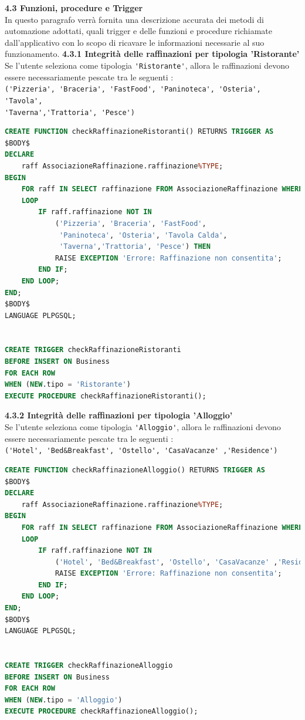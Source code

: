 \documentclass[a4paper,12pt]{article}
\begin{document}
\newpage\null{}\setcounter{page}{18}
\vspace{-2cm}
{\flushleft \bf 4.3 Funzioni, procedure e Trigger}
\\In questo paragrafo verrà fornita una descrizione accurata dei metodi di automazione adottati, quali trigger e delle funzioni e procedure richiamate dall'applicativo con lo scopo di ricavare le informazioni necessarie al suo funzionamento.
\vspace*{+1cm}
\newline
{\bf 4.3.1  Integrità delle raffinazioni per tipologia 'Ristorante'}\\
\normalsize{Se l'utente seleziona come tipologia \verb|'Ristorante'|, allora le raffinazioni
devono essere necessariamente pescate tra le seguenti : \\
\verb|('Pizzeria', 'Braceria', 'FastFood', 'Paninoteca', 'Osteria', 'Tavola',|\\
\verb|'Taverna','Trattoria', 'Pesce')|}
\begin{lstlisting}[language=SQL]
CREATE FUNCTION checkRaffinazioneRistoranti() RETURNS TRIGGER AS
$BODY$
DECLARE
	raff AssociazioneRaffinazione.raffinazione%TYPE;
BEGIN
	FOR raff IN SELECT raffinazione FROM AssociazioneRaffinazione WHERE codBusiness = NEW.codBusiness
	LOOP
		IF raff.raffinazione NOT IN 
			('Pizzeria', 'Braceria', 'FastFood',
			 'Paninoteca', 'Osteria', 'Tavola Calda',
			 'Taverna','Trattoria', 'Pesce') THEN
			RAISE EXCEPTION 'Errore: Raffinazione non consentita';
		END IF;
	END LOOP;
END;
$BODY$
LANGUAGE PLPGSQL;


CREATE TRIGGER checkRaffinazioneRistoranti
BEFORE INSERT ON Business
FOR EACH ROW
WHEN (NEW.tipo = 'Ristorante')
EXECUTE PROCEDURE checkRaffinazioneRistoranti();
\end{lstlisting}
\vspace*{+1cm}

{\flushleft \bf 4.3.2  Integrità delle raffinazioni per tipologia 'Alloggio'}\\
\normalsize{Se l'utente seleziona come tipologia \verb|'Alloggio'|, allora le raffinazioni
devono essere necessariamente pescate tra le seguenti : \\
\verb|('Hotel', 'Bed&Breakfast', 'Ostello', 'CasaVacanze' ,'Residence')|}
\begin{lstlisting}[language=SQL]
CREATE FUNCTION checkRaffinazioneAlloggio() RETURNS TRIGGER AS
$BODY$
DECLARE
	raff AssociazioneRaffinazione.raffinazione%TYPE;
BEGIN
	FOR raff IN SELECT raffinazione FROM AssociazioneRaffinazione WHERE codBusiness = NEW.codBusiness
	LOOP
		IF raff.raffinazione NOT IN 
			('Hotel', 'Bed&Breakfast', 'Ostello', 'CasaVacanze' ,'Residence') THEN
			RAISE EXCEPTION 'Errore: Raffinazione non consentita';
		END IF;
	END LOOP;
END;
$BODY$
LANGUAGE PLPGSQL;


CREATE TRIGGER checkRaffinazioneAlloggio
BEFORE INSERT ON Business
FOR EACH ROW
WHEN (NEW.tipo = 'Alloggio')
EXECUTE PROCEDURE checkRaffinazioneAlloggio();
\end{lstlisting}
\vspace*{+1cm}
\end{document}
